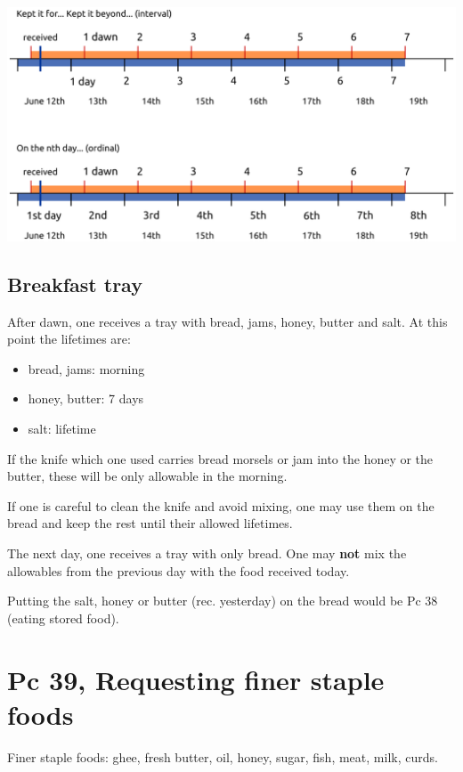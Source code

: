 \vspace*{\baselineskip}

\includegraphics{../../src/includes/figures/7-days.png}

\subsection{Breakfast tray}

After dawn, one receives a tray with bread, jams, honey, butter and
salt. At this point the lifetimes are:

\begin{itemize}
\tightlist
\item
  bread, jams: morning
\item
  honey, butter: 7 days
\item
  salt: lifetime
\end{itemize}

If the knife which one used carries bread morsels or jam into the honey
or the butter, these will be only allowable in the morning.

If one is careful to clean the knife and avoid mixing, one may use them
on the bread and keep the rest until their allowed lifetimes.

The next day, one receives a tray with only bread. One may \textbf{not}
mix the allowables from the previous day with the food received today.

Putting the salt, honey or butter (rec. yesterday) on the bread would be
Pc 38 (eating stored food).

\clearpage

\section{Pc 39, Requesting finer staple foods}

Finer staple foods: ghee, fresh butter, oil, honey, sugar, fish, meat,
milk, curds.

